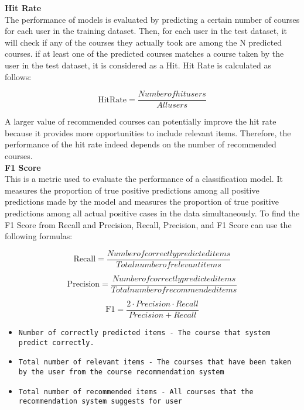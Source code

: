 \textbf{Hit Rate} \\
The performance of models is evaluated by predicting a certain number of courses for each user in the training dataset. Then, for each user in the test dataset, it will check if any of the courses they actually took are among the N predicted courses. if at least one of the predicted courses matches a course taken by the user in the test dataset, it is considered as a Hit. 
Hit Rate is calculated as follows:

\begin{equation}
    \text{HitRate} = \frac{Number of hit users}{All users}
\end{equation}

A larger value of recommended courses can potentially improve the hit rate because it provides more opportunities to include relevant items. Therefore, the performance of the hit rate indeed depends on the number of recommended courses.\\


\textbf{F1 Score}\\
This is a metric used to evaluate the performance of a classification model. It measures the proportion of true positive predictions among all positive predictions made by the model and measures the proportion of true positive predictions among all actual positive cases in the data simultaneously.
To find the F1 Score from Recall and Precision, Recall, Precision, and F1 Score can use the following formulas:

\begin{equation}
    \text{Recall} = \frac{Number of correctly predicted items}{Total number of relevant items}
\end{equation}

\begin{equation}
    \text{Precision} = \frac{Number of correctly predicted items}{Total number of recommended items}
\end{equation}

\begin{equation}
    \text{F1} = \frac{2⋅Precision⋅Recall}{Precision+Recall}
\end{equation}

\begin{itemize}
    \item \texttt{Number of correctly predicted items - The course that system predict correctly.}
    \item \texttt{Total number of relevant items - The courses that have been taken by the user from the course recommendation system}
    \item \texttt{Total number of recommended items - All courses that the recommendation system suggests for user}
\end{itemize}

